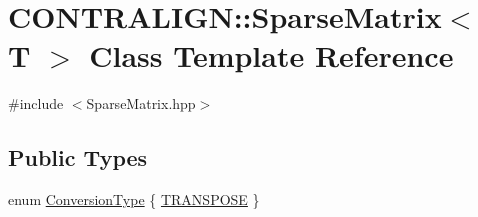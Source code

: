 \hypertarget{class_c_o_n_t_r_a_l_i_g_n_1_1_sparse_matrix}{\section{C\+O\+N\+T\+R\+A\+L\+I\+G\+N\+:\+:Sparse\+Matrix$<$ T $>$ Class Template Reference}
\label{class_c_o_n_t_r_a_l_i_g_n_1_1_sparse_matrix}
}


{\ttfamily \#include $<$Sparse\+Matrix.\+hpp$>$}

\subsection*{Public Types}
\begin{DoxyCompactItemize}
\item 
enum \hyperlink{class_c_o_n_t_r_a_l_i_g_n_1_1_sparse_matrix_a33a2e14b850b1767494ef115a660cf1c}{Conversion\+Type} \{ \hyperlink{class_c_o_n_t_r_a_l_i_g_n_1_1_sparse_matrix_a33a2e14b850b1767494ef115a660cf1ca8c1a1a563278991caa877ce886ca29c9}{T\+R\+A\+N\+S\+P\+O\+S\+E}
 \}
\end{DoxyCompactItemize}
